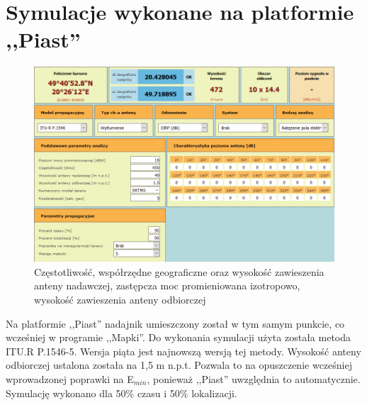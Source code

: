 \documentclass[12pt, a4paper, oneside]{article}
\begin{document}
\section{Symulacje wykonane na platformie ,,Piast''}
\begin{figure}[h!]
\centering
\includegraphics[scale=0.5]{pics/piast/f1.png}
\caption{Częstotliwość, współrzędne geograficzne oraz wysokość zawieszenia anteny nadawczej, zastępcza moc promieniowana izotropowo, wysokość zawieszenia anteny odbiorczej}
\end{figure}
\indent Na platformie ,,Piast'' nadajnik umieszczony został w tym samym punkcie, co wcześniej w programie ,,Mapki''. Do wykonania symulacji użyta została metoda ITU.R P.1546-5. Wersja piąta jest najnowszą wersją tej metody. Wysokość anteny odbiorczej ustalona została na 1,5 m n.p.t. Pozwala to na opuszczenie wcześniej wprowadzonej poprawki na E$_{min}$, ponieważ ,,Piast'' uwzględnia to automatycznie. Symulację wykonano dla 50\% czasu i 50\% lokalizacji.
\clearpage
\end{document}
